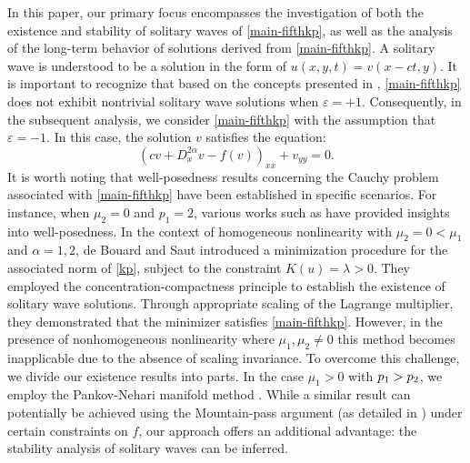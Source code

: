 \documentclass[10pt]{article}
\numberwithin{equation}{section}
\newcommand{\e}{\varepsilon}
\newcommand{\lam}{\lambda}
\newcommand{\mo}{\mu_1}  \newcommand{\po}{{p_1}}
\newcommand{\al}{\alpha}
\begin{document}
	In this paper, our primary focus encompasses the investigation of both the existence and stability of solitary waves of \eqref{main-fifthkp}, as well as the analysis of the long-term behavior of solutions derived from \eqref{main-fifthkp}. A solitary wave is understood to be a solution in the form of $u(x,y,t)=v(x-ct,y)$. It is important to recognize that based on the concepts presented in \cite{dbs-0}, \eqref{main-fifthkp} does not exhibit nontrivial solitary wave solutions when $\e=+1$. Consequently, in the subsequent analysis, we consider \eqref{main-fifthkp} with the assumption that $\e=-1$. In this case, the solution $v$ satisfies the equation:
	\begin{equation}\label{gkp}
		\left(cv+D_x^{2\al} v- f(v) \right)_{xx}  + v_{yy}=0.
	\end{equation}
	It is worth noting that well-posedness results concerning the Cauchy problem associated with \eqref{main-fifthkp} have been established in specific scenarios. For instance, when $\mu_2=0$ and $p_1=2$, various works such as \cite{grun,lps,ylhd,sanwaschi} have provided insights into well-posedness. In the context of homogeneous nonlinearity with $\mu_2=0<\mu_1$ and $\al=1,2$, de Bouard and Saut \cite{dbs-0} introduced a minimization procedure for the associated norm of \eqref{kp}, subject to the constraint $K(u)=\lam>0$. They employed the concentration-compactness principle to establish the existence of solitary wave solutions. Through appropriate scaling of the Lagrange multiplier, they demonstrated that the minimizer satisfies \eqref{main-fifthkp}. However, in the presence of nonhomogeneous nonlinearity where $\mu_1,\mu_2\neq0$ this method becomes inapplicable due to the absence of scaling invariance. 
		To overcome this challenge, we divide our existence results into parts. In the case $\mo>0$ with $\po>\poo$, we employ the Pankov-Nehari manifold method \cite{pankov}. While a similar result can potentially be achieved using the Mountain-pass argument (as detailed in \cite[Chapter 7]{willem}) under certain constraints on $f$, our approach offers an additional advantage: the stability analysis of solitary waves can be inferred. 
	
\end{document}
